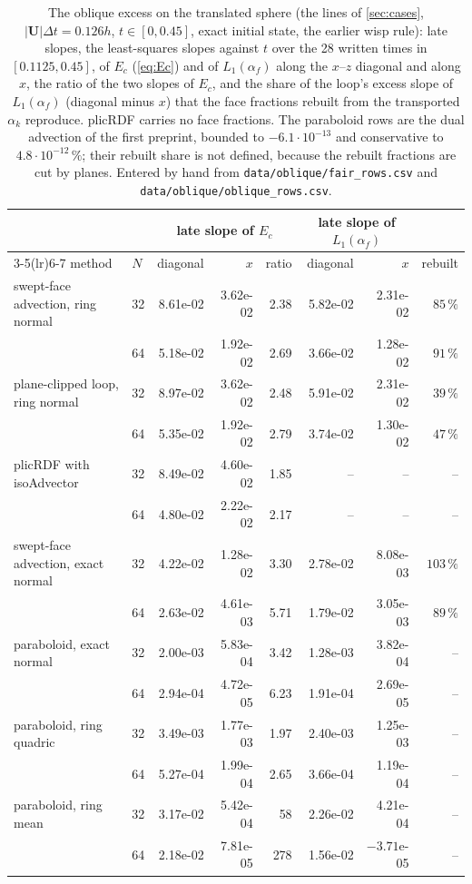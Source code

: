 \documentclass[preprint,12pt]{elsarticle}
\begin{document}
\begin{table}[htbp]
\centering
\caption{The oblique excess on the translated sphere (the lines of \cref{sec:cases}, $|\mathbf{U}|\Delta t = 0.126h$, $t \in [0, 0.45]$, exact initial state, the earlier wisp rule): late slopes, the least-squares slopes against $t$ over the 28 written times in $[0.1125, 0.45]$, of $E_c$ (\cref{eq:Ec}) and of $L_1(\alpha_f)$ along the $x$--$z$ diagonal and along $x$, the ratio of the two slopes of $E_c$, and the share of the loop's excess slope of $L_1(\alpha_f)$ (diagonal minus $x$) that the face fractions rebuilt from the transported $\alpha_k$ reproduce. plicRDF carries no face fractions. The paraboloid rows are the dual advection of the first preprint, bounded to $-6.1\cdot10^{-13}$ and conservative to $4.8\cdot10^{-12}\,\%$; their rebuilt share is not defined, because the rebuilt fractions are cut by planes. Entered by hand from \texttt{data/oblique/fair\_rows.csv} and \texttt{data/oblique/oblique\_rows.csv}.}
\label{tab:oblique}
\footnotesize
\setlength{\tabcolsep}{4pt}
\begin{tabular}{llrrrrrr}
\toprule
 & & \multicolumn{3}{c}{late slope of $E_c$} & \multicolumn{2}{c}{late slope of $L_1(\alpha_f)$} & \\
\cmidrule(lr){3-5}\cmidrule(lr){6-7}
method & $N$ & diagonal & $x$ & ratio & diagonal & $x$ & rebuilt \\
\midrule
swept-face advection, ring normal & 32 & 8.61e-02 & 3.62e-02 & 2.38 & 5.82e-02 & 2.31e-02 & $85\,\%$ \\
 & 64 & 5.18e-02 & 1.92e-02 & 2.69 & 3.66e-02 & 1.28e-02 & $91\,\%$ \\
plane-clipped loop, ring normal & 32 & 8.97e-02 & 3.62e-02 & 2.48 & 5.91e-02 & 2.31e-02 & $39\,\%$ \\
 & 64 & 5.35e-02 & 1.92e-02 & 2.79 & 3.74e-02 & 1.30e-02 & $47\,\%$ \\
plicRDF with isoAdvector & 32 & 8.49e-02 & 4.60e-02 & 1.85 & -- & -- & -- \\
 & 64 & 4.80e-02 & 2.22e-02 & 2.17 & -- & -- & -- \\
\midrule
swept-face advection, exact normal & 32 & 4.22e-02 & 1.28e-02 & 3.30 & 2.78e-02 & 8.08e-03 & $103\,\%$ \\
 & 64 & 2.63e-02 & 4.61e-03 & 5.71 & 1.79e-02 & 3.05e-03 & $89\,\%$ \\
\midrule
paraboloid, exact normal & 32 & 2.00e-03 & 5.83e-04 & 3.42 & 1.28e-03 & 3.82e-04 & -- \\
 & 64 & 2.94e-04 & 4.72e-05 & 6.23 & 1.91e-04 & 2.69e-05 & -- \\
paraboloid, ring quadric & 32 & 3.49e-03 & 1.77e-03 & 1.97 & 2.40e-03 & 1.25e-03 & -- \\
 & 64 & 5.27e-04 & 1.99e-04 & 2.65 & 3.66e-04 & 1.19e-04 & -- \\
paraboloid, ring mean & 32 & 3.17e-02 & 5.42e-04 & 58 & 2.26e-02 & 4.21e-04 & -- \\
 & 64 & 2.18e-02 & 7.81e-05 & 278 & 1.56e-02 & $-3.71$e-05 & -- \\
\bottomrule
\end{tabular}
\end{table}
\end{document}
